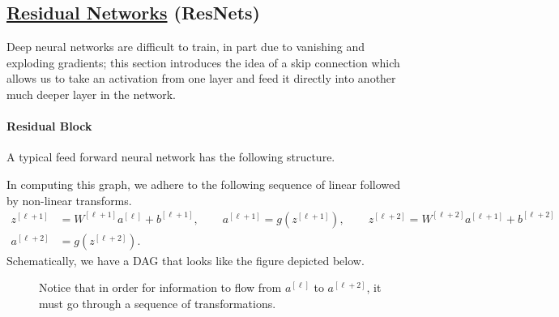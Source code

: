 \documentclass[12pt]{article}
\begin{document}
\subsection{\href{http://openaccess.thecvf.com/content_cvpr_2016/papers/He_Deep_Residual_Learning_CVPR_2016_paper.pdf}{Residual Networks} (ResNets)} Deep neural networks are difficult to train, in part due to
vanishing and exploding gradients; this section introduces the idea of a skip connection which allows us
to take an activation from one layer and feed it directly into another much deeper layer in the network.

\paragraph{Residual Block} A typical feed forward neural network has the following structure.
\begin{figure}[h]   \centering
   \end{figure}

In computing this graph, we adhere to the following sequence of linear followed by non-linear transforms.
\begin{align}   z^{[\ell+1]} &= W^{[\ell+1]} a^{[\ell]} + b^{[\ell+1]}, \hspace{25pt} a^{[\ell+1]} = g(z^{[\ell+1]}), \hspace{25pt} z^{[\ell+2]} = W^{[\ell+2]} a^{[\ell+1]} + b^{[\ell+2]} \nonumber \\
  \label{eq: skipconold}
  a^{[\ell+2]} &= g(z^{[\ell+2]}). \end{align}
Schematically, we have a DAG that looks like the figure depicted below.

\begin{figure}[h!]   \centering
  \label{fig: mainpathresnet}
  \caption{\footnotesize 
    Notice that in order for information to flow
 from $a^{[\ell]}$ to $a^{[\ell+2]}$, it must go through a sequence of transformations.} \end{figure}
\end{document}
